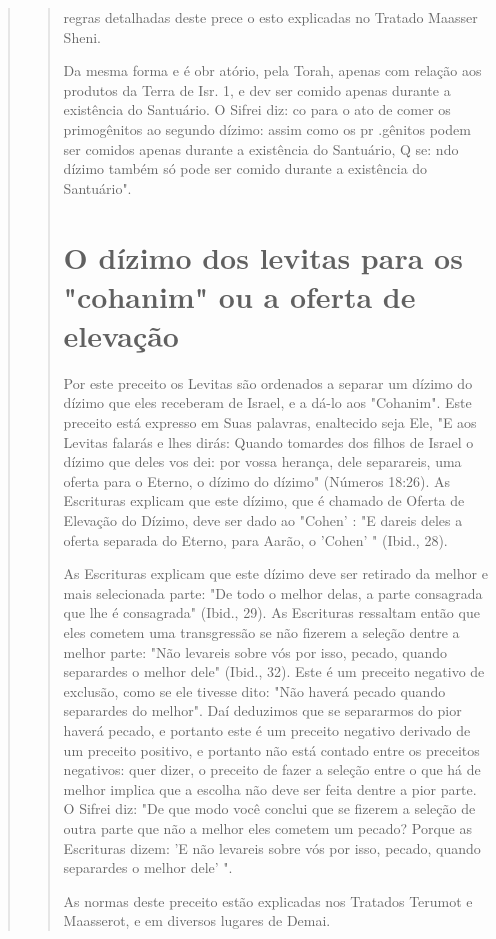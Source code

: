 \begin{quote}
\begin{quote}
regras detalhadas deste prece o esto explicadas no Tratado Maasser
Sheni.

Da mesma forma e é obr atório, pela Torah, apenas com relação aos
produtos da Terra de Isr. 1, e dev ser comido apenas durante a
existência do Santuário. O Sifrei diz: co para o ato de comer os
primogênitos ao segundo dízimo: assim como os pr .gênitos podem ser
comidos apenas du­rante a existência do Santuário, Q se: ndo dízimo
também só pode ser comido durante a existência do Santuário".

\section{O dízimo dos levitas para os "cohanim" ou a oferta de elevação}

Por este preceito os Levitas são ordenados a separar um dízimo do dízimo
que eles receberam de Israel, e a dá-lo aos "Cohanim". Este preceito
está expresso em Suas palavras, enaltecido seja Ele, "E aos Levitas
falarás e lhes dirás: Quando tomardes dos filhos de Israel o dízimo que
deles vos dei: por vossa herança, dele separareis, uma oferta para o
Eterno, o dízimo do dízimo" (Números 18:26). As Escrituras explicam que
este dízimo, que é chamado de Oferta de Elevação do Dízimo, deve ser
dado ao "Cohen' : "E dareis deles a oferta separada do Eterno, para
Aarão, o 'Cohen' " (Ibid., 28).

As Escrituras explicam que este dízimo deve ser retirado da melhor e
mais selecionada parte: "De todo o melhor delas, a parte consagrada que
lhe é consagrada" (Ibid., 29). As Escrituras ressaltam então que eles
cometem uma transgressão se não fizerem a seleção dentre a melhor parte:
"Não levareis so­bre vós por isso, pecado, quando separardes o melhor
dele" (Ibid., 32). Este é um preceito negativo de exclusão, como se ele
tivesse dito: "Não haverá pe­cado quando separardes do melhor". Daí
deduzimos que se separarmos do pior haverá pecado, e portanto este é um
preceito negativo derivado de um precei­to positivo, e portanto não está
contado entre os preceitos negativos: quer di­zer, o preceito de fazer a
seleção entre o que há de melhor implica que a esco­lha não deve ser
feita dentre a pior parte. O Sifrei diz: "De que modo você con­clui que
se fizerem a seleção de outra parte que não a melhor eles cometem um
pecado? Porque as Escrituras dizem: 'E não levareis sobre vós por isso,
pe­cado, quando separardes o melhor dele' ".

As normas deste preceito estão explicadas nos Tratados Terumot e
Maasserot, e em diversos lugares de Demai.


\end{quote}
\end{quote}
